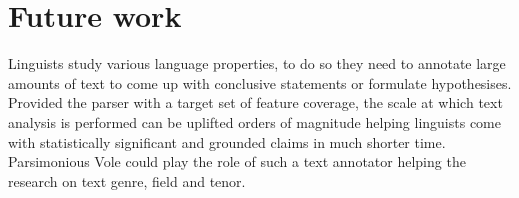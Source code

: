 \section{Future work}
\label{sec:future-work}


    Linguists study various language properties, to do so they need to annotate large amounts of text to come up with conclusive statements or formulate hypothesises. Provided the parser with a target set of feature coverage, the scale at which text analysis is performed can be uplifted orders of magnitude helping linguists come with statistically significant and grounded claims in much shorter time. Parsimonious Vole could play the role of such a text annotator helping the research on text genre, field and tenor.







